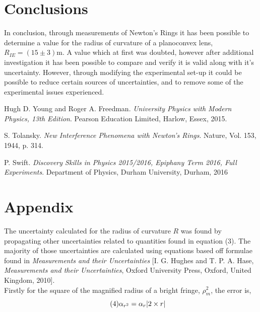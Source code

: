 \documentclass[twocolumn]{revtex4}
\begin{document}
\vspace{-5ex}
\section{Conclusions}
\vspace{-2ex}
 
In conclusion, through measurements of Newton's Rings it has been possible to determine a value for the radius of curvature of a planoconvex lens, $R_{IE}=(15\pm3)$m. A value which at first was doubted, however after additional investigation it has been possible to compare and verify it is valid along with it's uncertainty. However, through modifying the experimental set-up it could be possible to reduce certain sources of uncertainties, and to remove some of the experimental issues experienced.

\begin{thebibliography}{5}
	Hugh D. Young and Roger A. Freedman.
	\textit{University Physics with Modern Physics, 13th Edition}. 
	Pearson Education Limited, Harlow, Essex, 2015.
	
	S. Tolansky.
	\textit{New Interference Phenomena with Newton's Rings}.
	Nature, Vol. 153, 1944, p. 314.

	P. Swift.
	\textit{Discovery Skills in Physics 2015/2016, Epiphany Term 2016, Full Experiments}.
	Department of Physics, Durham University, Durham, 2016
	
\end{thebibliography}
\clearpage

\vfill
\twocolumngrid
\vspace{-3ex}
\section*{Appendix}
\vspace{-2ex}

The uncertainty calculated for the radius of curvature $R$ was found by propagating other uncertainties related to quantities found in equation (3). The majority of those uncertainties are calculated using equations based off formulae found in \textit{Measurements and their Uncertainties} [I. G. Hughes and T. P. A. Hase, \textit{Measurements and their Uncertainties}, Oxford University Press, Oxford, United Kingdom, 2010]. 
\\

Firstly for the square of the magnified radius of a bright fringe, $\rho_m^2$, the error is, 
\begin{equation} \tag{4}
\alpha_{r^2}=\alpha_r\abs{2\times r}
\end{equation}
\end{document}

